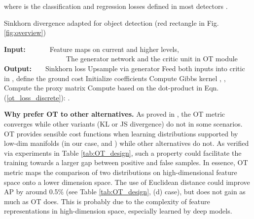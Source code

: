 \documentclass{article} \usepackage{iclr2019_conference,times}
\begin{document}
where  is the classification and regression losses defined in most detectors 
\citep{ross15_fast_rcnn}.  


\begin{algorithm}
	\caption{Sinkhorn divergence  adapted for object detection (red rectangle in Fig.\ref{fig:overview})}\label{algorithm}
	\begin{algorithmic}[H]\Statex 
		\textbf{Input:}~~~~~~~Feature maps on current and higher levels,  
		\Statex~~~~~~~~~~~~~~~~~~The generator network  and the critic unit in OT module 
		\Statex \textbf{Output:}~~~~Sinkhorn loss  \medskip
		\State Upsample via generator 
		\State Feed both inputs into critic  
		\State  in , define the ground cost  
		\medskip
		\Statex Initialize coefficients 
		\Statex Compute Gibbs kernel      
		  
		\State ,  
		, 
		\EndFor
		\State Compute the proxy matrix 
		\State Compute  based on the dot-product in Eqn. (\ref{ot_loss_discrete}): .
	\end{algorithmic}
\end{algorithm}








\textbf{Why prefer OT to other alternatives.}    
As proved in \citep{arjovsky2017_wgan}, the OT metric converges while other variants (KL or JS divergence) do not in some scenarios. 
OT provides sensible cost functions when learning distributions supported by low-dim manifolds (in our case,  and ) while other alternatives do not.  As verified via experiments in Table \ref{tab:OT_design}, such a property could facilitate the training towards a larger gap between positive and false samples.
In essence, OT metric maps the comparison of two distributions on high-dimensional feature space onto a lower dimension space. The use of Euclidean distance could improve AP by around 0.5\% (see Table \ref{tab:OT_design}, (d)  case), but does not gain as much as OT does. This is probably due to the complexity of feature representations in high-dimension space, especially learned by deep models.
\end{document}
